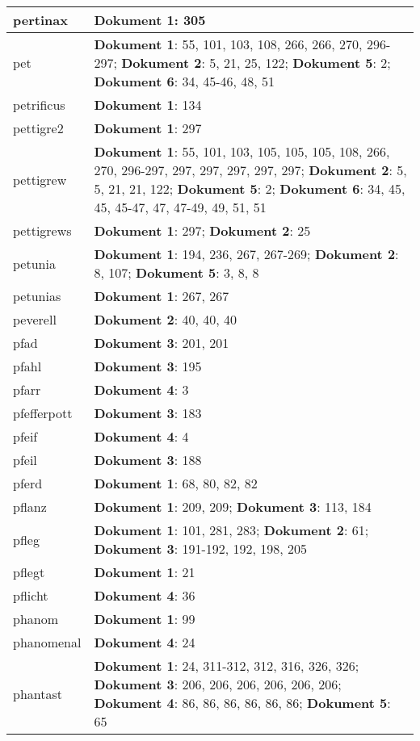 \documentclass[a5paper]{article}
\begin{document}
\begin{longtable}[l]{|l|p{3in}|}
pertinax & \textbf{Dokument 1}: 305 \\
\hline
pet & \textbf{Dokument 1}: 55, 101, 103, 108, 266, 266, 270, 296-297; \textbf{Dokument 2}: 5, 21, 25, 122; \textbf{Dokument 5}: 2; \textbf{Dokument 6}: 34, 45-46, 48, 51 \\
\hline
petrificus & \textbf{Dokument 1}: 134 \\
\hline
pettigre2 & \textbf{Dokument 1}: 297 \\
\hline
pettigrew & \textbf{Dokument 1}: 55, 101, 103, 105, 105, 105, 108, 266, 270, 296-297, 297, 297, 297, 297, 297; \textbf{Dokument 2}: 5, 5, 21, 21, 122; \textbf{Dokument 5}: 2; \textbf{Dokument 6}: 34, 45, 45, 45-47, 47, 47-49, 49, 51, 51 \\
\hline
pettigrews & \textbf{Dokument 1}: 297; \textbf{Dokument 2}: 25 \\
\hline
petunia & \textbf{Dokument 1}: 194, 236, 267, 267-269; \textbf{Dokument 2}: 8, 107; \textbf{Dokument 5}: 3, 8, 8 \\
\hline
petunias & \textbf{Dokument 1}: 267, 267 \\
\hline
peverell & \textbf{Dokument 2}: 40, 40, 40 \\
\hline
pfad & \textbf{Dokument 3}: 201, 201 \\
\hline
pfahl & \textbf{Dokument 3}: 195 \\
\hline
pfarr & \textbf{Dokument 4}: 3 \\
\hline
pfefferpott & \textbf{Dokument 3}: 183 \\
\hline
pfeif & \textbf{Dokument 4}: 4 \\
\hline
pfeil & \textbf{Dokument 3}: 188 \\
\hline
pferd & \textbf{Dokument 1}: 68, 80, 82, 82 \\
\hline
pflanz & \textbf{Dokument 1}: 209, 209; \textbf{Dokument 3}: 113, 184 \\
\hline
pfleg & \textbf{Dokument 1}: 101, 281, 283; \textbf{Dokument 2}: 61; \textbf{Dokument 3}: 191-192, 192, 198, 205 \\
\hline
pflegt & \textbf{Dokument 1}: 21 \\
\hline
pflicht & \textbf{Dokument 4}: 36 \\
\hline
phanom & \textbf{Dokument 1}: 99 \\
\hline
phanomenal & \textbf{Dokument 4}: 24 \\
\hline
phantast & \textbf{Dokument 1}: 24, 311-312, 312, 316, 326, 326; \textbf{Dokument 3}: 206, 206, 206, 206, 206, 206; \textbf{Dokument 4}: 86, 86, 86, 86, 86, 86; \textbf{Dokument 5}: 65 \\

\end{longtable}
\end{document}
